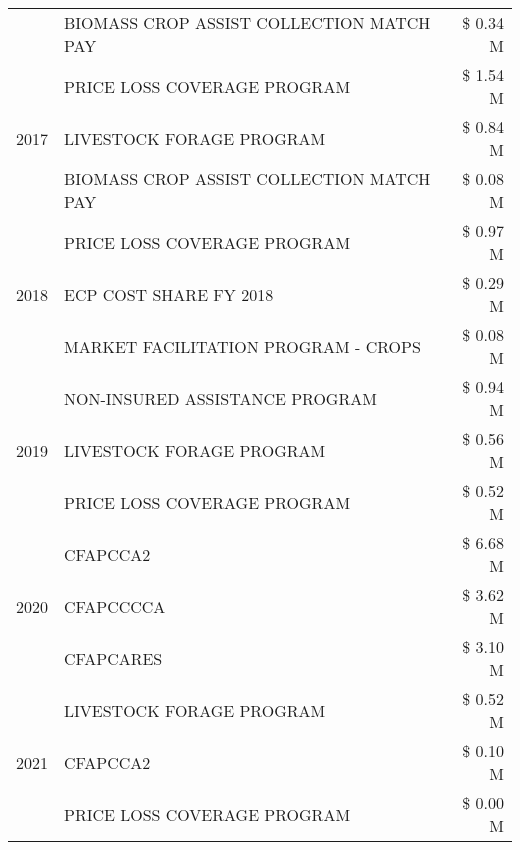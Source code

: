 \begin{tabular}{llr}
 & BIOMASS CROP ASSIST COLLECTION MATCH PAY      & \$ 0.34 M \\
\cline{1-3}
\multirow[t]{3}{*}{2017} & PRICE LOSS COVERAGE PROGRAM & \$ 1.54 M \\
 & LIVESTOCK FORAGE PROGRAM & \$ 0.84 M \\
 & BIOMASS CROP ASSIST COLLECTION MATCH PAY & \$ 0.08 M \\
\cline{1-3}
\multirow[t]{3}{*}{2018} & PRICE LOSS COVERAGE PROGRAM & \$ 0.97 M \\
 & ECP COST SHARE FY 2018 & \$ 0.29 M \\
 & MARKET FACILITATION PROGRAM - CROPS & \$ 0.08 M \\
\cline{1-3}
\multirow[t]{3}{*}{2019} & NON-INSURED ASSISTANCE PROGRAM & \$ 0.94 M \\
 & LIVESTOCK FORAGE PROGRAM & \$ 0.56 M \\
 & PRICE LOSS COVERAGE PROGRAM & \$ 0.52 M \\
\cline{1-3}
\multirow[t]{3}{*}{2020} & CFAPCCA2 & \$ 6.68 M \\
 & CFAPCCCCA & \$ 3.62 M \\
 & CFAPCARES & \$ 3.10 M \\
\cline{1-3}
\multirow[t]{3}{*}{2021} & LIVESTOCK FORAGE PROGRAM & \$ 0.52 M \\
 & CFAPCCA2 & \$ 0.10 M \\
 & PRICE LOSS COVERAGE PROGRAM & \$ 0.00 M \\
\cline{1-3}
\bottomrule
\end{tabular}
